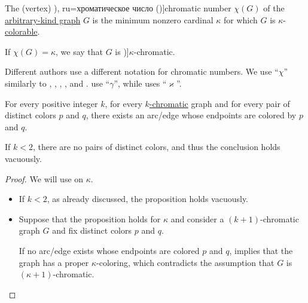 \begin{definition}\label{def:chromatic_number}
  The (vertex) \term[bg=хроматично число (\cite[142]{Мирчев2001}), ru=хроматическое число (\cite[235]{Емеличев1990})]{chromatic number} \( \chi(G) \) of the \hyperref[rem:arbitrary_kind_graph]{arbitrary-kind graph} \( G \) is the minimum nonzero cardinal \( \kappa \) for which \( G \) is \( \kappa \)-\hyperref[def:graph_coloring/colorable]{colorable}.

  If \( \chi(G) = \kappa \), we say that \( G \) is \term[ru=\( \kappa \)-хроматический (граф) (\cite[236]{Емеличев1990})]{\( \kappa \)-chromatic}.
\end{definition}
\begin{comments}
  \item Different authors use a different notation for chromatic numbers. We use \enquote{\( \chi \)} similarly to , , , ,  and .  use \enquote{\( \gamma \)}, while  uses \enquote{\( \varkappa \)}.
\end{comments}

\begin{proposition}\label{thm:chromatic_number_color_pairs}
  For every positive integer \( k \), for every \hyperref[def:chromatic_number]{\( k \)-chromatic} graph and for every pair of distinct colors \( p \) and \( q \), there exists an arc/edge whose endpoints are colored by \( p \) and \( q \).
\end{proposition}
\begin{comments}
  \item If \( k < 2 \), there are no pairs of distinct colors, and thus the conclusion holds vacuously.
\end{comments}
\begin{proof}
  We will use  on \( \kappa \).
  \begin{itemize}
    \item If \( k < 2 \), as already discussed, the proposition holds vacuously.

    \item Suppose that the proposition holds for \( \kappa \) and consider a \( (k + 1) \)-chromatic graph \( G \) and fix distinct colors \( p \) and \( q \).

    If no arc/edge exists whose endpoints are colored \( p \) and \( q \),  implies that the graph has a proper \( \kappa \)-coloring, which contradicts the assumption that \( G \) is \( (\kappa + 1) \)-chromatic.
  \end{itemize}
\end{proof}

